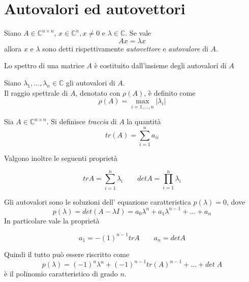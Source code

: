 \section{Autovalori ed autovettori}
\begin{defn}
\label{def:autovalore}
Siano $A \in \mathbb{C}^{n\times n}$, $x \in \mathbb{C}^{n}, x \neq 0$
e $\lambda \in \mathbb{C}$. Se vale 
$$ Ax = \lambda x $$ 
allora $x$ e $\lambda$ sono detti rispettivamente \emph{autovettore} e
\emph{autovalore} di $A$.
\end{defn}

\begin{defn}[Spettro di A]
Lo spettro di una matrice $A$ \`e costituito dall'insieme
degli autovalori di $A$
\end{defn}

\begin{defn}
Siano $\lambda_1, \ldots, \lambda_n \in \mathbb{C}$ gli autovalori di $A$. \\
Il raggio spettrale di $A$, denotato con $\rho(A)$, \`e 
definito come
$$ \rho(A) = \max_{i = 1, \ldots, n} | \lambda_i| $$ 
\end{defn}

\begin{defn}[Traccia di A]
Sia $A \in \mathbb{C}^{n\times n}$.
Si definisce \emph{traccia} di $A$ la quantit\`a
$$ tr(A) = \displaystyle \sum_{i=1}^{n} a_{ii}$$
\end{defn}

Valgono inoltre le seguenti propriet\`a
\begin{property}
$$ \displaystyle trA = \sum_{i=1}^{n} \lambda_i
\qquad
\displaystyle detA = \prod_{i=1}^{n} \lambda_i$$
\end{property}

Gli autovalori sono le soluzioni dell'
equazione caratteristica $p(\lambda) = 0$,
dove 
\begin{equation}
\label{eigenvalues:eq001}  p(\lambda) = det(A - \lambda I) =
 a_0 \lambda^{n} + a_1 \lambda^{n-1} +  \ldots + a_n 
\end{equation}
In particolare  vale la propriet\`a
\begin{property}
$$ a_1 = -(1)^{n-1}trA \qquad a_n= detA$$
\end{property}
Quindi il tutto può essere riscritto come
$$ p(\lambda)  =  (-1)^n\lambda^{n} + (-1)^{n-1}tr(A)^{n-1}+\ldots+det\; A $$
\`e il polinomio caratteristico di grado $n$. \\

